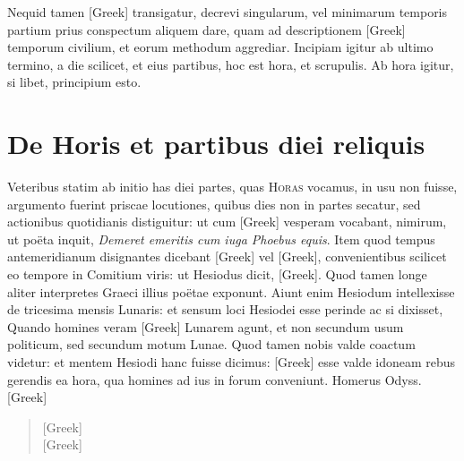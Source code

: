 Nequid tamen
\textgreek{[Greek]} transigatur, decrevi singularum, vel
 minimarum temporis
partium prius conspectum aliquem dare, quam ad descriptionem
\textgreek{[Greek]} temporum civilium, et eorum methodum aggrediar.
Incipiam igitur ab ultimo termino, a die scilicet, et eius partibus,
hoc est hora, et scrupulis.
Ab hora igitur, si libet, principium esto.

\section{De Horis et partibus diei reliquis}

Veteribus statim ab initio has diei partes, quas \textsc{Horas}
vocamus, in usu non fuisse, argumento fuerint priscae locutiones,
quibus dies non in partes secatur, sed actionibus quotidianis
distiguitur: ut cum \textgreek{[Greek]} vesperam vocabant, 
nimirum, ut poëta
inquit, \textit{Demeret emeritis cum iuga Phoebus equis}.
Item quod tempus
antemeridianum disignantes dicebant \textgreek{[Greek]}
 vel \textgreek{[Greek]},
convenientibus scilicet eo tempore in Comitium viris: ut Hesiodus dicit,
\textgreek{[Greek]}.
Quod tamen longe aliter interpretes
Graeci illius poëtae exponunt.
Aiunt enim Hesiodum intellexisse
de tricesima mensis Lunaris: et sensum loci Hesiodei esse perinde
ac si dixisset, Quando homines veram \textgreek{[Greek]} Lunarem agunt, et
non secundum usum politicum, sed secundum motum Lunae.
Quod
tamen nobis valde coactum videtur: et mentem Hesiodi hanc fuisse dicimus:
\textgreek{[Greek]} esse valde idoneam rebus gerendis ea hora,
 qua homines
ad ius in forum conveniunt.
Homerus Odyss. \textgreek{[Greek]}
\begin{verse}
\textgreek{[Greek]}\\
\textgreek{[Greek]}
\end{verse}

